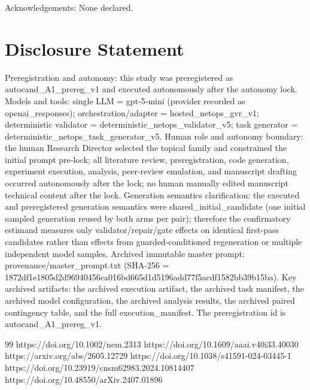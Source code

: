 \documentclass[conference]{IEEEtran}
\begin{document}
Acknowledgements: None declared.

\section*{Disclosure Statement}
Preregistration and autonomy: this study was preregistered as autocand\_A1\_prereg\_v1 and executed autonomously after the autonomy lock. Models and tools: single LLM = gpt‑5‑mini (provider recorded as openai\_responses); orchestration/adapter = hosted\_netops\_gvr\_v1; deterministic validator = deterministic\_netops\_validator\_v5; task generator = deterministic\_netops\_task\_generator\_v5. Human role and autonomy boundary: the human Research Director selected the topical family and constrained the initial prompt pre‑lock; all literature review, preregistration, code generation, experiment execution, analysis, peer‑review emulation, and manuscript drafting occurred autonomously after the lock; no human manually edited manuscript technical content after the lock. Generation semantics clarification: the executed and preregistered generation semantics were shared\_initial\_candidate (one initial sampled generation reused by both arms per pair); therefore the confirmatory estimand measures only validator/repair/gate effects on identical first‑pass candidates rather than effects from guarded‑conditioned regeneration or multiple independent model samples. Archived immutable master prompt: provenance/master\_prompt.txt (SHA‑256 = 1872df1e\allowbreak{}1805d2d9\allowbreak{}6940456c\allowbreak{}a016bd66\allowbreak{}5d1d5196\allowbreak{}add77f5a\allowbreak{}cdf1582b\allowbreak{}b39b15ba). Key archived artifacts: the archived execution artifact, the archived task manifest, the archived model configuration, the archived analysis results, the archived paired contingency table, and the full execution\_manifest. The preregistration id is autocand\_A1\_prereg\_v1.

\begin{thebibliography}{99}
 https://doi.org/10.1002/nem.2313
 https://doi.org/10.1609/aaai.v40i33.40030
 https://arxiv.org/abs/2605.12729
 https://doi.org/10.1038/s41591-024-03445-1
 https://doi.org/10.23919/cnsm62983.2024.10814407
 https://doi.org/10.48550/arXiv.2407.01896
\end{thebibliography}
\end{document}

